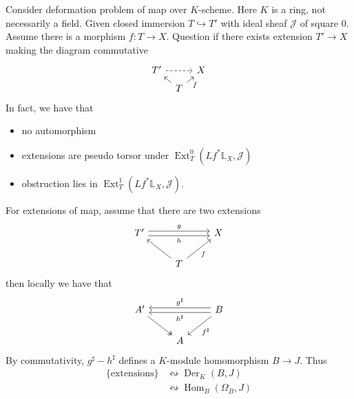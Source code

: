\documentclass{ctexart}
\renewcommand{\hom}{\operatorname{Hom}}
\newcommand{\derivation}{\operatorname{Der}}
\newcommand{\ext}{\operatorname{Ext}}
\begin{document}
Consider deformation problem of map over $K$-scheme.
Here $K$ is a ring, not necessarily a field.
Given closed immersion $T \hookrightarrow T'$ with ideal sheaf $\mathcal{J}$ of square $0$.
Assume there is a morphism $f: T \rightarrow X$.
Question if there exists extension $T' \rightarrow X$ making the diagram commutative
\begin{equation}
    \begin{tikzcd}[sep = tiny]
        T' \arrow[rr, dashrightarrow] &&
        X \\
        & T \arrow[ul] \arrow[ur, "f" swap] &
    \end{tikzcd}
\end{equation}
In fact, we have that
\begin{itemize}
    \item no automorphism 
    \item extensions are pseudo torsor under $\ext_{T}^{0}(Lf^{\ast}\mathbb{L}_{X}, \mathcal{J})$ 
    \item obstruction lies in $\ext_{T}^{1}(Lf^{\ast}\mathbb{L}_{X}, \mathcal{J})$.
\end{itemize}
For extensions of map, assume that there are two extensions
\begin{equation}
    \begin{tikzcd}
        T' \arrow[rr, "g", shift left] \arrow[rr, "h" swap, shift right] &&
        X \\
        & T \arrow[ul] \arrow[ur, "f" swap] &
    \end{tikzcd}
\end{equation}
then locally we have that
\begin{equation}
    \begin{tikzcd}
        A' \arrow[dr, twoheadrightarrow] &&
        B \arrow[dl, "f^{\sharp}"] \arrow[ll, "g^{\sharp}" swap, shift right] \arrow[ll, "h^{\sharp}", shift left] \\
        & A &
    \end{tikzcd}
\end{equation}
By commutativity, $g^{\sharp} - h^{\sharp}$ defines a $K$-module homomorphism $B \rightarrow J$.
Thus
\begin{equation}
    \begin{split}
        \{\text{extensions}\} & \leftrightsquigarrow \derivation_{K}(B, J) \\
        & \leftrightsquigarrow \hom_{B}(\Omega_{B}, J)
    \end{split}
\end{equation}
\end{document}
